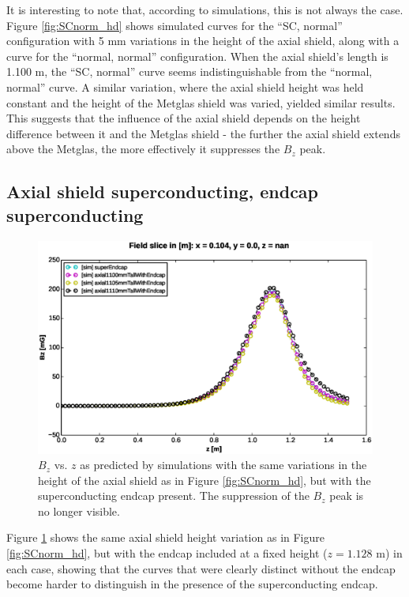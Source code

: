 \documentclass[twocolumn,aps,prb,citeautoscript]{revtex4-1}
\begin{document}
It is interesting to note that, according to simulations, this is not always the case. Figure \ref{fig:SCnorm_hd}
shows simulated curves for the ``SC, normal'' configuration with 5 mm variations in the height of the axial shield,
along with a curve for the ``normal, normal'' configuration. When the axial shield's length is 1.100 m, the
``SC, normal'' curve seems indistinguishable from the ``normal, normal'' curve.
A similar variation, where the axial shield height was held constant and the height of the Metglas shield was varied,
yielded similar results. This suggests that the influence of the axial shield depends on the
height difference between it and the Metglas shield - the further the axial shield extends above the Metglas,
the more effectively it suppresses the $B_z$ peak.

\subsection{Axial shield superconducting, endcap superconducting}

\begin{figure}
    \includegraphics[width=\textwidth]{figures/axial_effect_endcap.eps}
    \caption{\label{fig:SCSC_hd}$B_z$ vs. $z$ as predicted by simulations with the same variations in the height
    of the axial shield as in Figure \ref{fig:SCnorm_hd}, but with the superconducting endcap present. The
    suppression of the $B_z$ peak is no longer visible.}
\end{figure}

Figure \ref{fig:SCSC_hd} shows the same axial shield height variation as in Figure \ref{fig:SCnorm_hd}, but with
the endcap included at a fixed height ($z = 1.128$ m) in each case, showing that the curves that were clearly
distinct without the endcap become harder to distinguish in the presence of the superconducting endcap.
\end{document}
